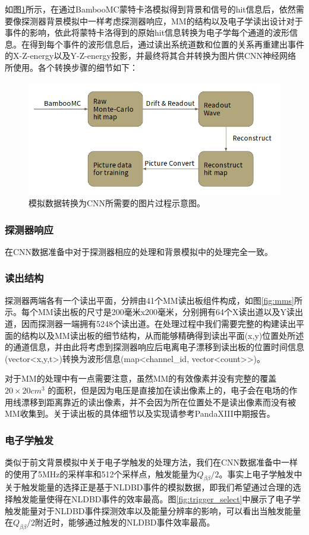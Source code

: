 如图\ref{fig:process}所示，在通过BambooMC蒙特卡洛模拟得到背景和信号的hit信息后，依然需要像探测器背景模拟中一样考虑探测器响应，MM的结构以及电子学读出设计对于事件的影响，依此将蒙特卡洛得到的原始hit信息转换为电子学每个通道的波形信息。在得到每个事件的波形信息后，通过读出系统道数和位置的关系再重建出事件的X-Z-energy以及Y-Z-energy投影，并最终将其合并转换为图片供CNN神经网络所使用。各个转换步骤的细节如下：

\begin{figure}
    \centering
    \includegraphics[width=0.6\columnwidth]{pic/process.png}
    \caption{模拟数据转换为CNN所需要的图片过程示意图。}
    \label{fig:process}
\end{figure}

\subsubsection{探测器响应}
    在CNN数据准备中对于探测器相应的处理和背景模拟中的处理完全一致。

\subsubsection{读出结构}
    探测器两端各有一个读出平面，分辨由41个MM读出板组件构成，如图\ref{fig:mms}所示。每个MM读出板的尺寸是200毫米x200毫米，分别拥有64个X读出道以及Y读出道，因而探测器一端拥有5248个读出道。在处理过程中我们需要完整的构建读出平面的结构以及MM读出板的细节结构，从而能够精确得到读出平面(x,y)位置处所述的通道信息，并由此将考虑到探测器响应后电离电子漂移到读出板的位置时间信息(vector<x,y,t>)转换为波形信息(map<channel\_id, vector<count>>)。

    对于MM的处理中有一点需要注意，虽然MM的有效像素并没有完整的覆盖$20\times20cm^3$
    的面积，但是因为电压是直接加在读出像素上的，电子会在电场的作用线漂移到距离靠近的读出像素，并不会因为所在位置处不是读出像素而没有被MM收集到。关于读出板的具体细节以及实现请参考PandaXIII中期报告\supercite{cdr}。

\subsubsection{电子学触发}
    类似于前文背景模拟中关于电子学触发的处理方法，我们在CNN数据准备中一样的使用了5MHz的采样率和512个采样点，触发能量为$Q_{\beta\beta}/2$。事实上电子学触发中关于触发能量的选择正是基于NLDBD事件的模拟数据，即我们希望通过合理的选择触发能量使得在NLDBD事件的效率最高。图\ref{fig:trigger_select}中展示了电子学触发能量对于NLDBD事件探测效率以及能量分辨率的影响，可以看出当触发能量在$Q_{\beta\beta}/2$附近时，能够通过触发的NLDBD事件效率最高。

